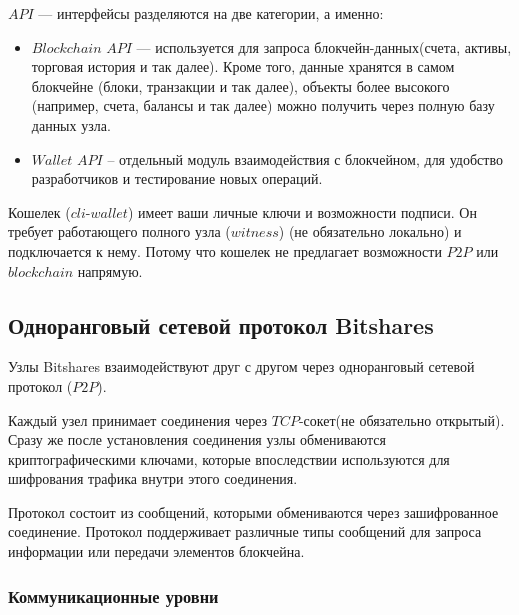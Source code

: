 \documentclass[a4paper, 14pt]{extarticle}
\begin{document}
$API$ --- интерфейсы разделяются на две категории, а именно:

\begin{itemize}
    \item $Blockchain$ $API$ --- используется для запроса блокчейн-данных(счета, активы, торговая история и так далее). Кроме того, данные хранятся в самом блокчейне (блоки, транзакции и так далее), объекты более высокого  (например, счета, балансы и так далее) можно получить через полную базу данных узла.
    \item $Wallet$ $API$ – отдельный модуль взаимодействия с блокчейном, для удобство разработчиков и тестирование новых операций.
\end{itemize}

Кошелек ($cli$-$wallet$) имеет ваши личные ключи и возможности подписи. Он требует работающего полного узла ($witness$) (не обязательно локально) и подключается к нему. Потому что кошелек не предлагает возможности $P2P$ или $blockchain$ напрямую.

\subsection{Одноранговый сетевой протокол Bitshares}
Узлы Bitshares взаимодействуют друг с другом через одноранговый сетевой протокол ($P2P$).

Каждый узел принимает соединения через $TCP$-сокет(не обязательно открытый). Сразу же после установления соединения узлы обмениваются криптографическими ключами, которые впоследствии используются для шифрования трафика внутри этого соединения.

Протокол состоит из сообщений, которыми обмениваются через зашифрованное соединение. Протокол поддерживает различные типы сообщений для запроса информации или передачи элементов блокчейна.

\subsubsection{Коммуникационные уровни}
\end{document}
